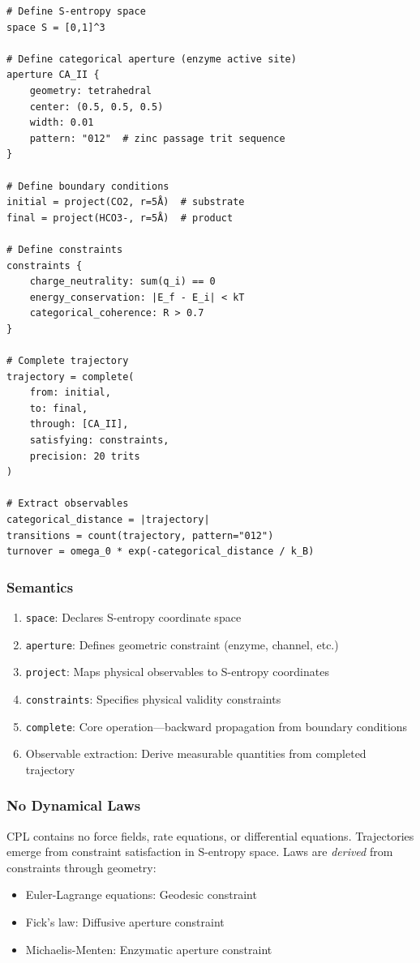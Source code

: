 \begin{verbatim}
# Define S-entropy space
space S = [0,1]^3

# Define categorical aperture (enzyme active site)
aperture CA_II {
    geometry: tetrahedral
    center: (0.5, 0.5, 0.5)
    width: 0.01
    pattern: "012"  # zinc passage trit sequence
}

# Define boundary conditions
initial = project(CO2, r=5Å)  # substrate
final = project(HCO3-, r=5Å)  # product

# Define constraints
constraints {
    charge_neutrality: sum(q_i) == 0
    energy_conservation: |E_f - E_i| < kT
    categorical_coherence: R > 0.7
}

# Complete trajectory
trajectory = complete(
    from: initial,
    to: final,
    through: [CA_II],
    satisfying: constraints,
    precision: 20 trits
)

# Extract observables
categorical_distance = |trajectory|
transitions = count(trajectory, pattern="012")
turnover = omega_0 * exp(-categorical_distance / k_B)
\end{verbatim}

\subsubsection{Semantics}

\begin{enumerate}
\item \texttt{space}: Declares S-entropy coordinate space
\item \texttt{aperture}: Defines geometric constraint (enzyme, channel, etc.)
\item \texttt{project}: Maps physical observables to S-entropy coordinates
\item \texttt{constraints}: Specifies physical validity constraints
\item \texttt{complete}: Core operation---backward propagation from boundary conditions
\item Observable extraction: Derive measurable quantities from completed trajectory
\end{enumerate}

\subsubsection{No Dynamical Laws}

CPL contains no force fields, rate equations, or differential equations. Trajectories emerge from constraint satisfaction in S-entropy space. Laws are \emph{derived} from constraints through geometry:
\begin{itemize}
\item Euler-Lagrange equations: Geodesic constraint
\item Fick's law: Diffusive aperture constraint
\item Michaelis-Menten: Enzymatic aperture constraint
\end{itemize}

